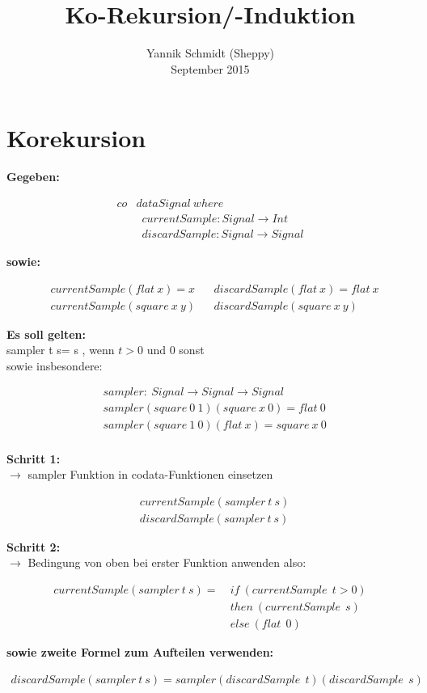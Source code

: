 \documentclass{article}
\title{Ko-Rekursion/-Induktion}
\author{Yannik Schmidt (Sheppy)\\September 2015}
\date{ }
\begin{document}
	\maketitle
	\section{Korekursion}
	\textbf{Gegeben:}
		\begin{fleqn}
				\begin{align*}
					co&data Signal\:where  \\
					& \enspace currentSample : Signal \rightarrow Int \\
					& \enspace discardSample : Signal \rightarrow Signal
				\end{align*}
		\end{fleqn}
	\textbf{sowie:}
	\begin{fleqn}
	\begin{align*}
		&currentSample(flat\:x) = x			&
		&discardSample(flat\:x) = flat\:x	\\
		&currentSample(square\:x\:y)		&
		&discardSample(square\:x\:y)		
	\end{align*}	
	\end{fleqn}
	\textbf{Es soll gelten:}\\
	sampler t s\enspace = s , wenn $t>0$ und 0 sonst\\
	sowie insbesondere:
	\begin{fleqn}
	\begin{align*}
		&sampler:\:Signal\rightarrow Signal\rightarrow Signal \\
		&sampler(square\:0\:1)(square\:x\:0) = flat\:0 \\
		&sampler(square\:1\:0)(flat\:x) = square\:x\:0  \\
	\end{align*}	
	\end{fleqn}
	\textbf{Schritt 1:}\\
	$\rightarrow$ sampler Funktion in codata-Funktionen einsetzen
	\begin{fleqn}
	\begin{align*}
		&currentSample(sampler\:t\:s)\\
		&discardSample(sampler\:t\:s)	
	\end{align*}	
	\end{fleqn}
	\textbf{Schritt 2:}\\
	$\rightarrow$ Bedingung von oben bei erster Funktion anwenden also:
	\begin{fleqn}
		\begin{align*}
			currentSample(sampler\:t\:s) = \:&if\:(currentSample\:\:t>0)\\
											&then\:(currentSample\:\:s)\\
											&else\:(flat\:\:0)
		\end{align*}
	\end{fleqn}
	\textbf{sowie zweite Formel zum Aufteilen verwenden:}
		\begin{fleqn}
		\begin{align*}
			discardSample(sampler\:t\:s) = sampler(discardSample\:\:t)(discardSample\:\:s)
		\end{align*}
	\end{fleqn}
	\newpage
\end{document}
